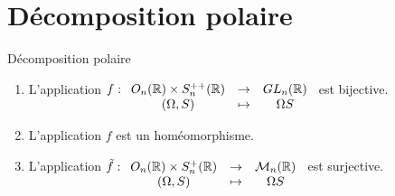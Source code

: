 \section{Décomposition polaire}

\begin{theoreme}{Décomposition polaire}{}
    \begin{enumerate}
        \item L'application $f : \begin{array}[t]{ccc}
        O_n(\mathbb{R}) \times S_n^{++}(\mathbb{R}) & \to & GL_n(\mathbb{R}) \\
        (\Omega, S) & \mapsto & \Omega S
        \end{array}$ est bijective.
        \item L'application $f$ est un homéomorphisme.
        \item L'application $\tilde{f} : \begin{array}[t]{ccc}
        O_n(\mathbb{R}) \times S_n^+(\mathbb{R}) & \to & \mathcal{M}_n(\mathbb{R}) \\
        (\Omega, S) & \mapsto & \Omega S
        \end{array}$ est surjective.
    \end{enumerate}
\end{theoreme}

